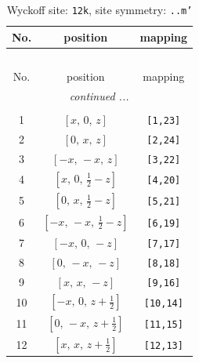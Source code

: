 \documentclass[fleqn,8pt]{jsarticle}
\begin{document}
\begin{longtable}{ccc}
\caption{Wyckoff site: {\tt 12k}, site symmetry: {\tt ..m'}}
 \\
 \hline \hline
No. & position & mapping \\ \hline \endfirsthead

\multicolumn{2}{l}{\tablename\ \thetable{}} \\
 \hline \hline
No. & position & mapping \\ \hline \endhead

 \hline \hline
\multicolumn{2}{r}{\footnotesize\it continued ...} \\ \endfoot

 \hline \hline
\multicolumn{2}{r}{} \\ \endlastfoot

1 & $\left[ x,\, 0,\, z \right]$ & {\tt [1,23]} \\ \hline
2 & $\left[ 0,\, x,\, z \right]$ & {\tt [2,24]} \\ \hline
3 & $\left[ - x,\, - x,\, z \right]$ & {\tt [3,22]} \\ \hline
4 & $\left[ x,\, 0,\, \frac{1}{2} - z \right]$ & {\tt [4,20]} \\ \hline
5 & $\left[ 0,\, x,\, \frac{1}{2} - z \right]$ & {\tt [5,21]} \\ \hline
6 & $\left[ - x,\, - x,\, \frac{1}{2} - z \right]$ & {\tt [6,19]} \\ \hline
7 & $\left[ - x,\, 0,\, - z \right]$ & {\tt [7,17]} \\ \hline
8 & $\left[ 0,\, - x,\, - z \right]$ & {\tt [8,18]} \\ \hline
9 & $\left[ x,\, x,\, - z \right]$ & {\tt [9,16]} \\ \hline
10 & $\left[ - x,\, 0,\, z + \frac{1}{2} \right]$ & {\tt [10,14]} \\ \hline
11 & $\left[ 0,\, - x,\, z + \frac{1}{2} \right]$ & {\tt [11,15]} \\ \hline
12 & $\left[ x,\, x,\, z + \frac{1}{2} \right]$ & {\tt [12,13]} \\
\end{longtable}
\renewcommand{\arraystretch}{1.2}
\end{document}
